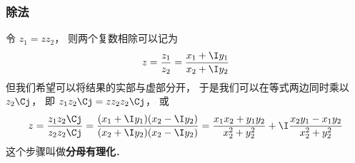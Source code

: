 \subsubsection{除法}
令 $z_1 = z z_2$， 则两个复数相除可以记为
\begin{equation}
z = \frac{z_1}{z_2} = \frac{x_1 + \I y_1}{x_2 + \I y_2}
\end{equation}
但我们希望可以将结果的实部与虚部分开， 于是我们可以在等式两边同时乘以 $z_2\Cj$， 即 $z_1 z_2\Cj  = z z_2 z_2\Cj$， 或
\begin{equation}
z = \frac{z_1 z_2\Cj}{z_2 z_2\Cj}
= \frac{(x_1 + \I y_1)(x_2 - \I y_2)}{(x_2 + \I y_2)(x_2 - \I y_2)}
= \frac{x_1 x_2 + y_1 y_2}{x_2^2 + y_2^2} + \I \frac{x_2 y_1 - x_1 y_2}{x_2^2 + y_2^2}
\end{equation}
这个步骤叫做\textbf{分母有理化}．
